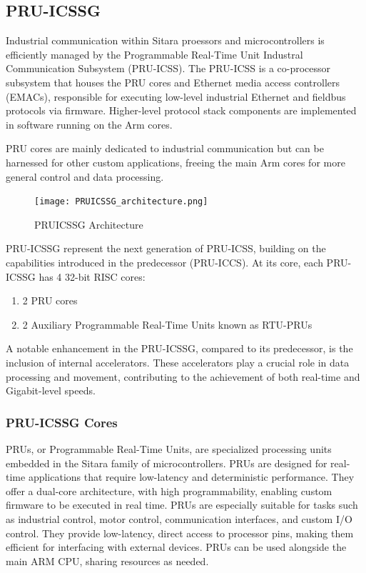 \subsection{PRU-ICSSG}

Industrial communication within Sitara proessors and microcontrollers is
efficiently managed by the Programmable Real-Time Unit Industral Communication
Subsystem (PRU-ICSS). The PRU-ICSS is a co-processor subsystem that houses the
PRU cores and Ethernet media access controllers (EMACs), responsible for
executing low-level industrial Ethernet and fieldbus protocols via firmware.
Higher-level protocol stack components are implemented in software running on
the Arm cores.

PRU cores are mainly dedicated to industrial communication but can be harnessed
for other custom applications, freeing the main Arm cores for more general
control and data processing.

\begin{figure}[ht]
    \centering
    \texttt{[image: PRUICSSG\_architecture.png]}
    \caption{PRUICSSG Architecture}
\end{figure}


PRU-ICSSG represent the next generation of PRU-ICSS, building on the
capabilities introduced in the predecessor (PRU-ICCS).
At its core, each PRU-ICSSG has 4 32-bit RISC cores:

\begin{enumerate}
    \item 2 PRU cores
    \item 2 Auxiliary Programmable Real-Time Units known as RTU-PRUs
\end{enumerate}


A notable enhancement in the PRU-ICSSG, compared to its predecessor, is the
inclusion of internal accelerators. These accelerators play a crucial role in
data processing and movement, contributing to the achievement of both real-time
and Gigabit-level speeds.

\subsubsection{PRU-ICSSG Cores}

PRUs, or Programmable Real-Time Units, are specialized processing units
embedded in the Sitara family of microcontrollers. PRUs are designed for
real-time applications that require low-latency and deterministic performance.
They offer a dual-core architecture, with high programmability, enabling custom
firmware to be executed in real time. PRUs are especially suitable for tasks
such as industrial control, motor control, communication interfaces, and custom
I/O control. They provide low-latency, direct access to processor pins, making
them efficient for interfacing with external devices. PRUs can be used
alongside the main ARM CPU, sharing resources as needed.


